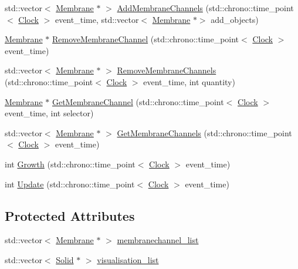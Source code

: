 \begin{DoxyCompactItemize}
\item 
std\+::vector$<$ \hyperlink{class_membrane}{Membrane} $\ast$ $>$ \hyperlink{class_membrane_aab591875e3266d6c5af0f7c5f7f21e8f}{Add\+Membrane\+Channels} (std\+::chrono\+::time\+\_\+point$<$ \hyperlink{universe_8h_a0ef8d951d1ca5ab3cfaf7ab4c7a6fd80}{Clock} $>$ event\+\_\+time, std\+::vector$<$ \hyperlink{class_membrane}{Membrane} $\ast$$>$ add\+\_\+objects)
\item 
\hyperlink{class_membrane}{Membrane} $\ast$ \hyperlink{class_membrane_a36d6927c8869cc752b55623dac661107}{Remove\+Membrane\+Channel} (std\+::chrono\+::time\+\_\+point$<$ \hyperlink{universe_8h_a0ef8d951d1ca5ab3cfaf7ab4c7a6fd80}{Clock} $>$ event\+\_\+time)
\item 
std\+::vector$<$ \hyperlink{class_membrane}{Membrane} $\ast$ $>$ \hyperlink{class_membrane_ac33ffd86416112420dc5b0576287c44d}{Remove\+Membrane\+Channels} (std\+::chrono\+::time\+\_\+point$<$ \hyperlink{universe_8h_a0ef8d951d1ca5ab3cfaf7ab4c7a6fd80}{Clock} $>$ event\+\_\+time, int quantity)
\item 
\hyperlink{class_membrane}{Membrane} $\ast$ \hyperlink{class_membrane_a1e2bdb800f0f38254214ea7cbdc06941}{Get\+Membrane\+Channel} (std\+::chrono\+::time\+\_\+point$<$ \hyperlink{universe_8h_a0ef8d951d1ca5ab3cfaf7ab4c7a6fd80}{Clock} $>$ event\+\_\+time, int selector)
\item 
std\+::vector$<$ \hyperlink{class_membrane}{Membrane} $\ast$ $>$ \hyperlink{class_membrane_a7fac2929241b7ff9b8b7f1ec955b2cc5}{Get\+Membrane\+Channels} (std\+::chrono\+::time\+\_\+point$<$ \hyperlink{universe_8h_a0ef8d951d1ca5ab3cfaf7ab4c7a6fd80}{Clock} $>$ event\+\_\+time)
\item 
int \hyperlink{class_membrane_a544742864485b9ac052f3b241ae5c6b4}{Growth} (std\+::chrono\+::time\+\_\+point$<$ \hyperlink{universe_8h_a0ef8d951d1ca5ab3cfaf7ab4c7a6fd80}{Clock} $>$ event\+\_\+time)
\item 
int \hyperlink{class_membrane_a4af9710ea7f0bc6f1b6b6b6462612d51}{Update} (std\+::chrono\+::time\+\_\+point$<$ \hyperlink{universe_8h_a0ef8d951d1ca5ab3cfaf7ab4c7a6fd80}{Clock} $>$ event\+\_\+time)
\end{DoxyCompactItemize}
\subsection*{Protected Attributes}
\begin{DoxyCompactItemize}
\item 
std\+::vector$<$ \hyperlink{class_membrane}{Membrane} $\ast$ $>$ \hyperlink{class_membrane_ad41c9c20d5a1bc279f32f9001dee8c50}{membranechannel\+\_\+list}
\item 
std\+::vector$<$ \hyperlink{class_solid}{Solid} $\ast$ $>$ \hyperlink{class_membrane_a926d35c07f664b60deb6e9f87649fe89}{visualisation\+\_\+list}
\end{DoxyCompactItemize}
